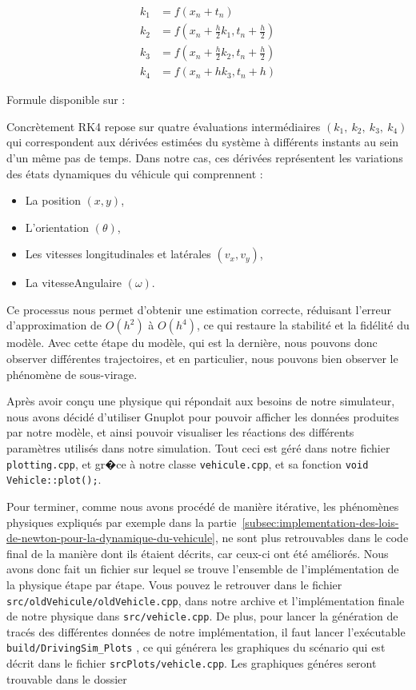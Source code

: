 \begin{align}
    k_1 &= f(x_n+t_n)\\
    k_2 &= f(x_n+ {\frac{h}{2}}k_1, t_n + {\frac{h}{2}})\\
    k_3 &= f(x_n+ {\frac{h}{2}}k_2, t_n + {\frac{h}{2}})\\
    k_4 &= f(x_n+ hk_3, t_n + h)
\end{align}
\begin{center}
    Formule disponible sur : \cite{RK4}
\end{center}
Concrètement RK4 repose sur quatre évaluations intermédiaires $(k_1, \ k_2, \ k_3, \ k_4)$ qui correspondent aux
dérivées estimées du système à différents instants au sein d'un même pas de temps.
Dans notre cas, ces dérivées
représentent les variations des états dynamiques du véhicule qui comprennent :

\begin{itemize}
    \item La position $(x,y)$,
    \item L'orientation $(\theta)$,
    \item Les vitesses longitudinales et latérales $(v_x, v_y)$,
    \item La \gls{vitesseAngulaire} $(\omega)$.
\end{itemize}

Ce processus nous permet d'obtenir une estimation correcte, réduisant l'erreur d'approximation de $O(h^2)$ à $O(h^4)$, ce qui restaure la stabilité et la fidélité du modèle.
Avec cette étape du modèle, qui est la dernière, nous pouvons donc observer différentes trajectoires, et en particulier, nous pouvons bien observer le phénomène de sous-virage.

Après avoir conçu une physique qui répondait aux besoins de notre simulateur, nous avons décidé d'utiliser \gls{Gnuplot} pour pouvoir afficher les données produites par notre modèle, et ainsi pouvoir visualiser les réactions des différents paramètres utilisés dans notre simulation.
Tout ceci est géré dans notre fichier \texttt{plotting.cpp}, et gr�ce à notre classe \texttt{vehicule.cpp}, et sa fonction \texttt{void Vehicle::plot();}.

Pour terminer, comme nous avons procédé de manière itérative, les phénomènes physiques expliqués par exemple dans la partie~\ref{subsec:implementation-des-lois-de-newton-pour-la-dynamique-du-vehicule}, ne sont plus retrouvables dans le code final de la manière dont ils étaient décrits, car ceux-ci ont été améliorés.
Nous avons donc fait un fichier sur lequel se trouve l'ensemble de l'implémentation de la physique étape par étape.
Vous pouvez le retrouver dans le fichier \texttt{src/oldVehicule/oldVehicle.cpp}, dans notre archive et l'implémentation finale de notre physique dans \texttt{src/vehicle.cpp}.
De plus, pour lancer la génération de tracés des différentes données de notre implémentation, il faut lancer l'exécutable \texttt{build/DrivingSim\_Plots} , ce qui générera les graphiques du scénario qui est décrit dans le fichier \texttt{srcPlots/vehicle.cpp}.
Les graphiques généres seront trouvable dans le dossier \texttt{}
